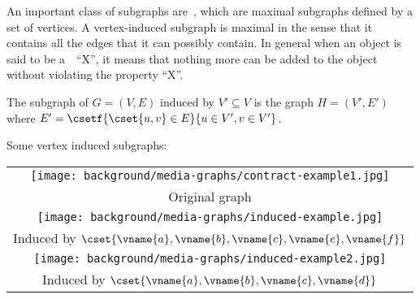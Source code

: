 \begin{cluster}
\label{grp:grm:bg::graphs::class}

\begin{gram}
\label{grm:bg::graphs::class}
An important class of subgraphs are~,
which are maximal subgraphs defined by a set of vertices.
A vertex-induced subgraph is maximal in the sense that it contains all
the edges that it can possibly contain.
In general when an object is said to be a~~``X'', it
means that nothing more can be added to the object without violating
the property ``X''.

\end{gram}
\end{cluster}

\begin{cluster}
\label{grp:def:bg::graphs::subgraph::vi}

\begin{definition}
\label{def:bg::graphs::subgraph::vi}
The subgraph of $G = (V,E)$ induced by $V' \subseteq V$ is the graph $H
= (V',E')$ where $E' = \csetf{\cset{u,v} \in E}{u \in V', v \in V'}$.

\end{definition}
\end{cluster}

\begin{cluster}
\label{grp:xmpl:bg::graphs::vertex}

\begin{example}
\label{xmpl:bg::graphs::vertex}
Some vertex induced subgraphs:
\begin{center}
\begin{tabular}{c}
\texttt{[image: background/media-graphs/contract-example1.jpg]}
\\
Original graph 
\\
\texttt{[image: background/media-graphs/induced-example.jpg]}
\\
 Induced by
$\cset{\vname{a},\vname{b},\vname{c},\vname{e},\vname{f}}$ 
\\
\texttt{[image: background/media-graphs/induced-example2.jpg]}
\\
Induced by $\cset{\vname{a},\vname{b},\vname{c},\vname{d}}$
\end{tabular}
\end{center}

\end{example}
\end{cluster}

